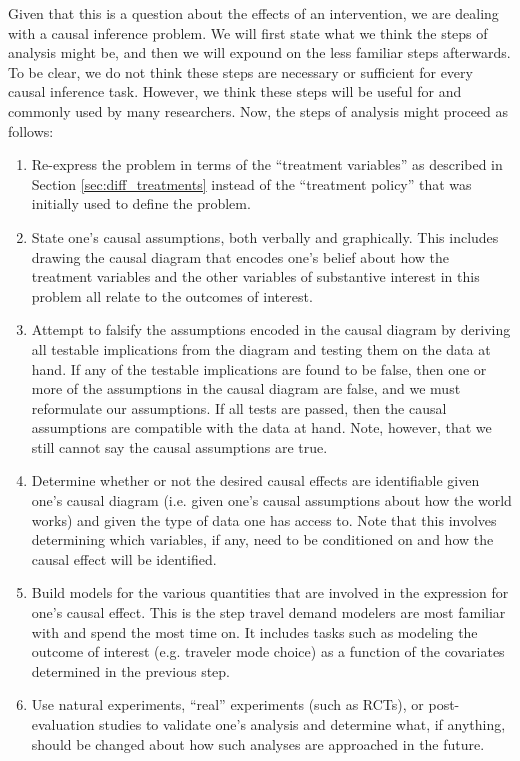 Given that this is a question about the effects of an intervention, we are dealing with a causal inference problem. We will first state what we think the steps of analysis might be, and then we will expound on the less familiar steps afterwards. To be clear, we do not think these steps are necessary or sufficient for every causal inference task. However, we think these steps will be useful for and commonly used by many researchers. Now, the steps of analysis might proceed as follows:
\begin{enumerate}
\item
\label{step:re-express-problem}
Re-express the problem in terms of the ``treatment variables'' as described in Section \ref{sec:diff_treatments} instead of the ``treatment policy'' that was initially used to define the problem.

\item
\label{step:draw-diagram}
State one's causal assumptions, both verbally and graphically. This includes drawing the causal diagram that encodes one's belief about how the treatment variables and the other variables of substantive interest in this problem all relate to the outcomes of interest.

\item
\label{step:test-causal-assumptions}
Attempt to falsify the assumptions encoded in the causal diagram by deriving all testable implications from the diagram and testing them on the data at hand. If any of the testable implications are found to be false, then one or more of the assumptions in the causal diagram are false, and we must reformulate our assumptions. If all tests are passed, then the causal assumptions are compatible with the data at hand. Note, however, that we still cannot say the causal assumptions are true.

\item
\label{step:identification-check}
Determine whether or not the desired causal effects are identifiable given one's causal diagram (i.e. given one's causal assumptions about how the world works) and given the type of data one has access to. Note that this involves determining which variables, if any, need to be conditioned on and how the causal effect will be identified.

\item
\label{step:model-building}
Build models for the various quantities that are involved in the expression for one's causal effect. This is the step travel demand modelers are most familiar with and spend the most time on. It includes tasks such as modeling the outcome of interest (e.g. traveler mode choice) as a function of the covariates determined in the previous step.

\item
\label{step:post-evaluation}
Use natural experiments, ``real'' experiments (such as RCTs), or post-evaluation studies to validate one's analysis and determine what, if anything, should be changed about how such analyses are approached in the future.
\end{enumerate}


